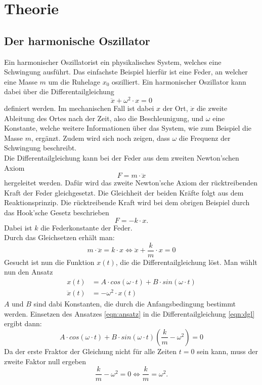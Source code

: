 \section{Theorie}
\label{sec:Theorie}
\subsection{Der harmonische Oszillator}
Ein harmonischer Oszillatorist ein physikalisches System, welches eine Schwingung ausführt. Das einfachste Beispiel
hierfür ist eine Feder, an welcher eine Masse  $m$ um die Ruhelage $x_0$ oszilliert.
Ein harmonischer Oszillator kann dabei über die Differentailgleichung
\begin{equation}
    \ddot{x}+\omega^2\cdot x=0
\end{equation}
definiert werden. Im mechanischen Fall ist dabei $x$ der Ort, $\ddot{x}$ die zweite Ableitung des Ortes nach der Zeit,
also die Beschleunigung, und $\omega$ eine Konstante, welche weitere Informationen über das System, wie zum Beispiel die 
Masse $m$, ergänzt. Zudem wird sich noch zeigen, dass $\omega$ die Frequenz der Schwingung beschreibt.
\\
Die Differentailgleichung kann bei der Feder aus dem zweiten Newton'schen Axiom
\begin{equation}
    F=m\cdot\dddot{x} \label{eqn:newton2}
\end{equation} 
hergeleitet werden. Dafür wird das zweite Newton'sche Axiom der rücktreibenden Kraft der Feder gleichgesetzt. Die 
Gleichheit der beiden Kräfte folgt aus dem Reaktionsprinzip. Die rücktreibende Kraft wird bei dem obrigen Beispiel
durch das Hook'sche Gesetz beschrieben
\begin{equation}
    F=-k\cdot x \label{eqn:hook}. %
\end{equation}
Dabei ist $k$ die Federkonstante der Feder.
\\
Durch das Gleichsetzen erhält man:
\begin{equation}
    m\cdot\dddot{x}=k\cdot x \Leftrightarrow \ddot{x}+\frac{k}{m}\cdot x=0 \label{eqn:dgl}
\end{equation}
Gesucht ist nun die Funktion $x(t)$, die die Differentailgleichung löst. Man wählt nun den Ansatz
\begin{align}
    x(t)&=A\cdot cos(\omega\cdot t)+B\cdot sin(\omega\cdot t) \\
    \ddot{x}(t)&=-\omega^2\cdot x(t)
    \label{eqn:ansatz}
\end{align}
$A$ und $B$ sind dabi Konstanten, die durch die Anfangsbedingung bestimmt werden. Einsetzen des Ansatzes \eqref{eqn:ansatz}
in die Differentailgleichung \eqref{eqn:dgl} ergibt dann:
\begin{equation}
    A\cdot cos(\omega\cdot t)+B\cdot sin(\omega\cdot t)(\frac{k}{m}-\omega^2)=0
\end{equation}
Da der erste Fraktor der Gleichung nicht für alle Zeiten $t=0$ sein kann, muss der zweite Faktor null ergeben
\begin{equation}
    \frac{k}{m}-\omega^2=0 \Leftrightarrow \frac{k}{m}=\omega^2 .
\end{equation}
